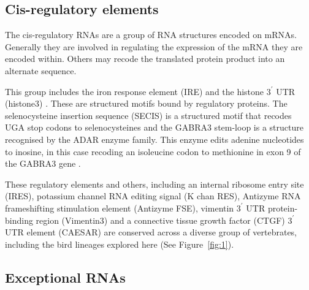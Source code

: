 \documentclass[10pt]{bmc_article}
\newenvironment{bmcformat}{\begin{raggedright}\baselineskip20pt\sloppy\setboolean{publ}{false}}{\end{raggedright}\baselineskip20pt\sloppy}
\begin{document}
\begin{bmcformat}





\subsection*{Cis-regulatory elements}

The cis-regulatory RNAs are a group of RNA structures encoded on
mRNAs. Generally they are involved in regulating the expression of the
mRNA they are encoded within. Others may recode the translated protein
product into an alternate sequence.

This group includes the iron response element (IRE) \cite{Stevens:}
and the histone $3^\prime$ UTR (histone3)
\cite{Davila_Lopez:2008a}. These are structured motifs bound by
regulatory proteins. The selenocysteine insertion sequence (SECIS) is
a structured motif that recodes UGA stop codons to selenocysteines
\cite{Lambert:2002} and the GABRA3 stem-loop is a structure recognised
by the ADAR enzyme family. This enzyme edits adenine nucleotides to
inosine, in this case recoding an isoleucine codon to methionine in
exon 9 of the GABRA3 gene \cite{Ohlson:2007}.

These regulatory elements and others, including an internal ribosome
entry site (IRES), potassium channel RNA editing signal (K chan RES),
Antizyme RNA frameshifting stimulation element (Antizyme FSE),
vimentin $3^\prime$ UTR protein-binding region (Vimentin3) and a
connective tissue growth factor (CTGF) $3^\prime$ UTR element (CAESAR)
are conserved across a diverse group of vertebrates, including the
bird lineages explored here (See Figure~\ref{fig:1}).

\subsection*{Exceptional RNAs}


\end{bmcformat}
\end{document}
